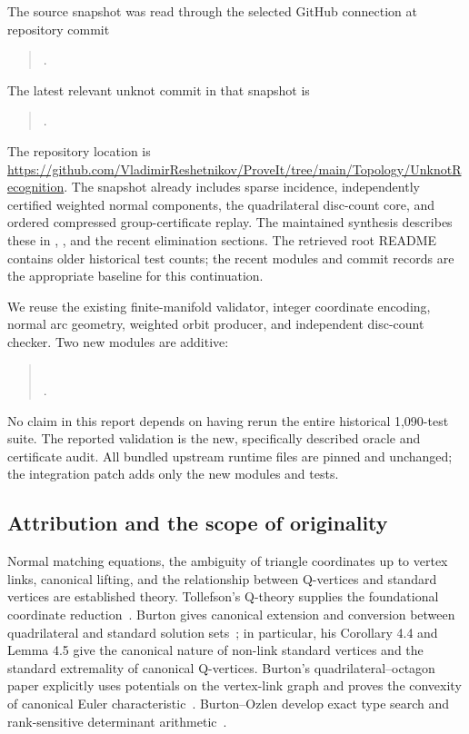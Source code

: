 \documentclass[11pt]{article}
\theoremstyle{definition}
\theoremstyle{remark}
\begin{document}
The source snapshot was read through the selected GitHub connection at
repository commit
\begin{quote}\small
{}.
\end{quote}
The latest relevant unknot commit in that snapshot is
\begin{quote}\small
{}.
\end{quote}
The repository location is
\url{https://github.com/VladimirReshetnikov/ProveIt/tree/main/Topology/UnknotRecognition}.
The snapshot already includes sparse incidence, independently certified weighted
normal components, the quadrilateral disc-count core, and ordered compressed
group-certificate replay. The maintained synthesis describes these in
,
, and the recent elimination sections.
The retrieved root README contains older historical test counts; the recent
modules and commit records are the appropriate baseline for this continuation.

We reuse the existing finite-manifold validator, integer coordinate encoding,
normal arc geometry, weighted orbit producer, and independent disc-count checker.
Two new modules are additive:
\begin{quote}\small
{}\\
.
\end{quote}
No claim in this report depends on having rerun the entire historical
1,090-test suite. The reported validation is the new, specifically described
oracle and certificate audit. All bundled upstream runtime files are pinned
and unchanged; the integration patch adds only the new modules and tests.

\subsection{Attribution and the scope of originality}

Normal matching equations, the ambiguity of triangle coordinates up to vertex
links, canonical lifting, and the relationship between Q-vertices and standard
vertices are established theory. Tollefson's Q-theory supplies the foundational
coordinate reduction~\cite{tollefson}. Burton gives canonical extension and
conversion between quadrilateral and standard solution sets~\cite{burton2009};
in particular, his Corollary 4.4 and Lemma 4.5 give the canonical nature of
non-link standard vertices and the standard extremality of canonical Q-vertices.
Burton's quadrilateral--octagon paper explicitly uses potentials on the
vertex-link graph and proves the convexity of canonical Euler
characteristic~\cite[proofs of Theorems 4.5 and 5.5]{burton2010}.
Burton--Ozlen develop exact type search and rank-sensitive determinant
arithmetic~\cite{burtonozlen2013,burtonozlen2014}.
\end{document}
